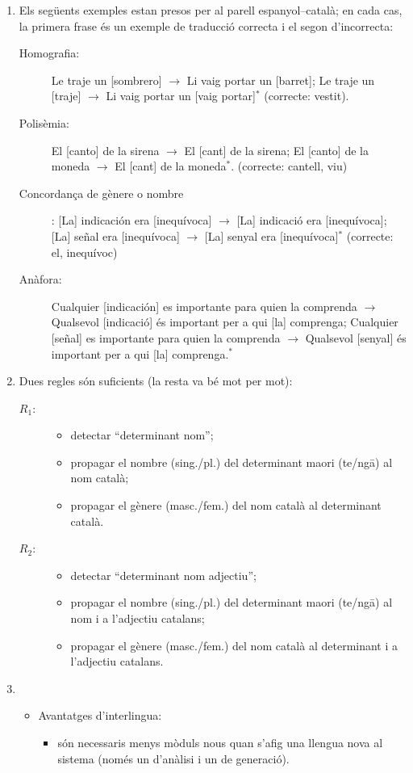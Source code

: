 \begin{enumerate}
 \item Els següents exemples estan presos per al parell
   espanyol--català; en cada cas, la primera frase és un exemple de
   traducció correcta i el segon d'incorrecta:
   \begin{description}
   \item[Homografia:] Le traje un [sombrero] $\rightarrow$ 
     Li vaig portar un [barret]; 
     Le traje un [traje] $\rightarrow$ Li vaig portar un [vaig
     portar]$^*$ (correcte: vestit). 
    \item[Polisèmia:] El [canto] de la sirena $\rightarrow$ 
     El [cant] de la sirena;
     El [canto] de la moneda $\rightarrow$ El [cant] de la moneda$^*$.
     (correcte: cantell, viu)
     \item[Concordança de gènere o nombre]: 
     [La] indicación era [inequívoca]
     $\rightarrow$ [La] indicació era [inequívoca]; 
     [La] señal era [inequívoca]
     $\rightarrow$ [La] senyal era [inequívoca]$^*$ (correcte: 
     el, inequívoc)
     \item[Anàfora:] Cualquier [indicación] es importante para quien la
     comprenda $\rightarrow$ Qualsevol [indicació] és important per a qui [la]
     comprenga; Cualquier [señal] es importante para quien la
     comprenda $\rightarrow$ Qualsevol [senyal] és important per a qui [la]
     comprenga.$^*$
 \end{description}

\item Dues regles són suficients (la resta va bé mot per mot):
 
  \begin{description}
  \item[$R_1$:] 

    \begin{itemize}
    \item detectar ``determinant nom'';
    \item propagar el nombre (sing./pl.) del determinant maori
      (te/ng\={a}) al nom català;
    \item propagar el gènere (masc./fem.) del nom català al determinant
      català.
    \end{itemize}
  \item[$R_2$:]
    \begin{itemize}
    \item detectar ``determinant nom adjectiu'';
    \item propagar el nombre (sing./pl.) del determinant maori
      (te/ng\={a}) al nom i a l'adjectiu catalans;
    \item propagar el gènere (masc./fem.) del nom català al
      determinant i a l'adjectiu catalans.
    \end{itemize}
  \end{description}
\item
  \begin{itemize}
  \item Avantatges d'interlingua:
    \begin{itemize}
    \item són necessaris menys mòduls nous quan s'afig una llengua
      nova al sistema (només un d'anàlisi i un de generació).
    

\end{itemize}
\end{itemize}
\end{enumerate}
